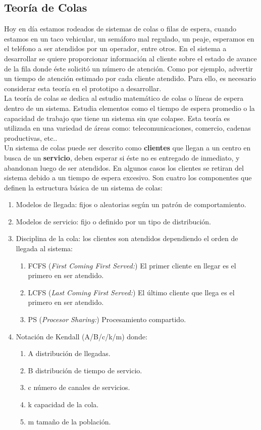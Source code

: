 \subsection{Teoría de Colas}

Hoy en día estamos rodeados de sistemas de colas o filas de espera, cuando estamos en un taco vehicular, un semáforo mal regulado, un peaje, esperamos en el teléfono a ser atendidos por un operador, entre otros. En el sistema a desarrollar se quiere proporcionar información al cliente sobre el estado de avance de la fila donde éste solicitó un número de atención. Como por ejemplo, advertir un tiempo de atención estimado por cada cliente atendido. Para ello, es necesario considerar esta teoría en el prototipo a desarrollar.\\

La teoría de colas se dedica al estudio matemático de colas o líneas de espera dentro de un sistema. Estudia elementos como el tiempo de espera promedio o la capacidad de trabajo que tiene un sistema sin que colapse. Esta teoría es utilizada en una variedad de áreas como: telecomunicaciones, comercio, cadenas productivas, etc..\\

Un sistema de colas puede ser descrito como \textbf{clientes} que llegan a un centro en busca de un \textbf{servicio}, deben esperar si éste no es entregado de inmediato, y abandonan luego de ser atendidos. En algunos casos los clientes se retiran del sistema debido a un tiempo de espera excesivo. Son cuatro los componentes que definen la estructura básica de un sistema de colas\cite{Sch04}: 

\begin{enumerate}
\item Modelos de llegada: fijos o aleatorias según un patrón de comportamiento.
\item Modelos de servicio: fijo o definido por un tipo de distribución.
\item Disciplina de la cola: los clientes son atendidos dependiendo el orden de llegada al sistema: 
\begin{enumerate}
\item FCFS (\textit{First Coming First Served:}) El primer cliente en llegar es el primero en ser atendido.
\item LCFS (\textit{Last Coming First Served:}) El último cliente que llega es el primero en ser atendido.
\item PS (\textit{Procesor Sharing:}) Procesamiento compartido.
\end{enumerate}
\item Notación de Kendall (A/B/c/k/m) donde:
\begin{enumerate}
\item A distribución de llegadas.
\item B distribución de tiempo de servicio.
\item c número de canales de servicios.
\item k capacidad de la cola.
\item m tamaño de la población.
\end{enumerate}
\end{enumerate}

